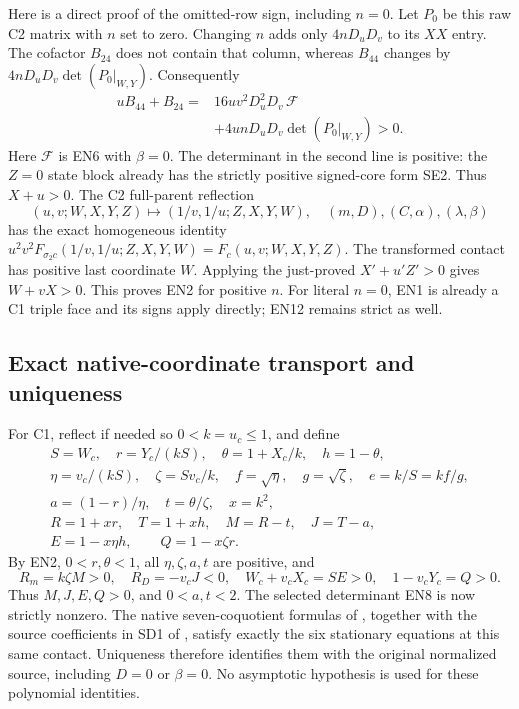 Here is a direct proof of the omitted-row sign, including \(n=0\).
Let \(P_0\) be this raw C2 matrix with \(n\) set to zero.
Changing \(n\) adds only \(4nD_uD_v\) to its \(XX\) entry.
The cofactor \(B_{24}\) does not contain that column, whereas
\(B_{44}\) changes by \(4nD_uD_v\det(P_0|_{W,Y})\).
Consequently
\[
\begin{split}
 uB_{44}+B_{24}
  ={}&16uv^2D_u^2D_v\,\mathcal F\\
    &+4unD_uD_v\det(P_0|_{W,Y})>0 .
\end{split}\tag{EN12}
\]
Here \(\mathcal F\) is EN6 with \(\beta=0\).  The determinant in
the second line is positive: the \(Z=0\) state block already has
the strictly positive signed-core form SE2.  Thus \(X+u>0\).
The C2 full-parent reflection
\[
 (u,v;W,X,Y,Z)\mapsto(1/v,1/u;Z,X,Y,W),
 \quad (m,D),(C,\alpha),(\lambda,\beta)
\]
has the exact homogeneous identity
\(u^2v^2F_{\sigma_2c}(1/v,1/u;Z,X,Y,W)=F_c(u,v;W,X,Y,Z)\).
The transformed contact
has positive last coordinate \(W\).  Applying the just-proved
\(X'+u'Z'>0\) gives \(W+vX>0\).
This proves EN2 for positive \(n\).  For literal \(n=0\), EN1 is
already a C1 triple face and its signs apply directly; EN12 remains
strict as well.

\subsection{Exact native-coordinate transport and uniqueness}

For C1, reflect if needed so \(0<k=u_c\le1\), and define
\[
\begin{gathered}
 S=W_c,\quad r=Y_c/(kS),\quad
 \theta=1+X_c/k,\quad h=1-\theta,\\
 \eta=v_c/(kS),\quad \zeta=Sv_c/k,\quad
 f=\sqrt\eta,\quad g=\sqrt\zeta,\quad e=k/S=kf/g,\\
 a=(1-r)/\eta,\quad t=\theta/\zeta,\quad x=k^2,\\
 R=1+xr,\quad T=1+xh,\quad M=R-t,\quad J=T-a,\\
 E=1-x\eta h,\qquad Q=1-x\zeta r .
\end{gathered}\tag{EN13}
\]
By EN2, \(0<r,\theta<1\), all \(\eta,\zeta,a,t\) are positive,
and
\[
 R_m=k\zeta M>0,\quad R_D=-v_cJ<0,\quad
 W_c+v_cX_c=SE>0,\quad 1-v_cY_c=Q>0.
\]
Thus \(M,J,E,Q>0\), and \(0<a,t<2\).
The selected determinant EN8 is now strictly nonzero.  The native
seven-coquotient formulas of , together
with the source coefficients in SD1 of ,
satisfy exactly the six stationary equations at this same contact.
Uniqueness therefore identifies them with the original normalized
source, including \(D=0\) or \(\beta=0\).  No asymptotic hypothesis
is used for these polynomial identities.

